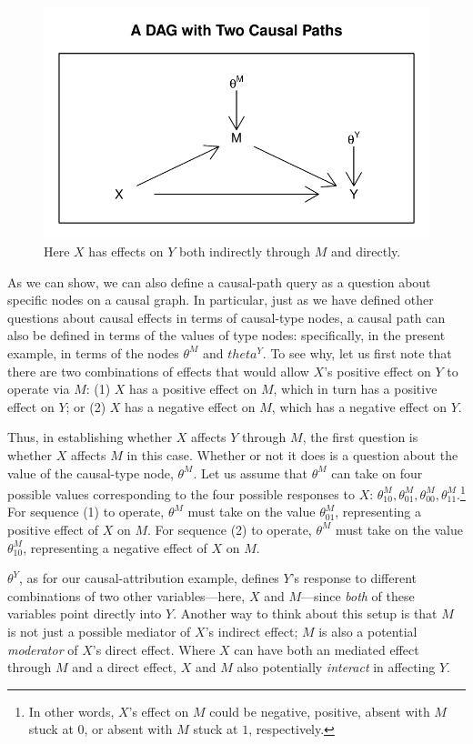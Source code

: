 \documentclass[12pt,]{book}
\let\rmarkdownfootnote\footnote%
\def\footnote{\protect\rmarkdownfootnote}
\begin{document}
\begin{figure}

{\centering \includegraphics[width=.5\textwidth]{ii_files/figure-latex/unnamed-chunk-18-1} 

}

\caption{\label{fig:DAGpaths} Here $X$ has effects on $Y$ both indirectly through $M$ and directly.}\label{fig:unnamed-chunk-18}
\end{figure}

As we can show, we can also define a causal-path query as a question about specific nodes on a causal graph. In particular, just as we have defined other questions about causal effects in terms of causal-type nodes, a causal path can also be defined in terms of the values of type nodes: specifically, in the present example, in terms of the nodes \(\theta^M\) and \(theta^Y\). To see why, let us first note that there are two combinations of effects that would allow \(X\)'s positive effect on \(Y\) to operate via \(M\): (1) \(X\) has a positive effect on \(M\), which in turn has a positive effect on \(Y\); or (2) \(X\) has a negative effect on \(M\), which has a negative effect on \(Y\).

Thus, in establishing whether \(X\) affects \(Y\) through \(M\), the first question is whether \(X\) affects \(M\) in this case. Whether or not it does is a question about the value of the causal-type node, \(\theta^M\). Let us assume that \(\theta^M\) can take on four possible values corresponding to the four possible responses to \(X\): \(\theta^M_{10}, \theta^M_{01}, \theta^M_{00}, \theta^M_{11}\).\footnote{In other words, \(X\)'s effect on \(M\) could be negative, positive, absent with \(M\) stuck at \(0\), or absent with \(M\) stuck at \(1\), respectively.} For sequence (1) to operate, \(\theta^M\) must take on the value \(\theta^M_{01}\), representing a positive effect of \(X\) on \(M\). For sequence (2) to operate, \(\theta^M\) must take on the value \(\theta^M_{10}\), representing a negative effect of \(X\) on \(M\).

\(\theta^Y\), as for our causal-attribution example, defines \(Y\)'s response to different combinations of two other variables---here, \(X\) and \(M\)---since \emph{both} of these variables point directly into \(Y\). Another way to think about this setup is that \(M\) is not just a possible mediator of \(X\)'s indirect effect; \(M\) is also a potential \emph{moderator} of \(X\)'s direct effect. Where \(X\) can have both an mediated effect through \(M\) and a direct effect, \(X\) and \(M\) also potentially \emph{interact} in affecting \(Y\).
\end{document}
